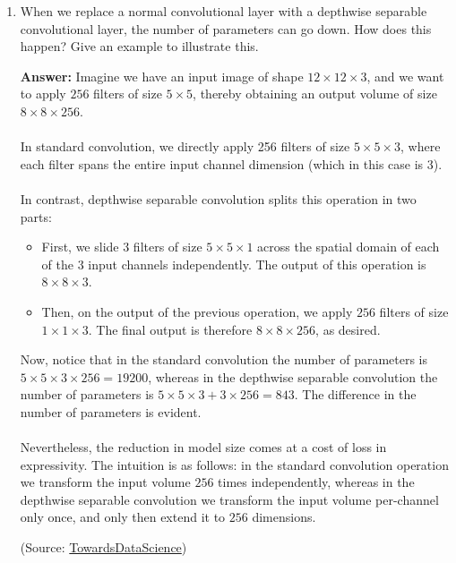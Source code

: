 \documentclass{article}
\newenvironment{QandA}{\begin{enumerate}[label=\arabic*.]}{\end{enumerate}}
\newenvironment{answer}{\par\normalfont \textbf{Answer:}}{}
\begin{document}
\begin{QandA}
    \item When we replace a normal convolutional layer with a depthwise separable convolutional layer, the number of parameters can go down. How does this happen? Give an example to illustrate this.
    \begin{answer}
        Imagine we have an input image of shape $12 \times 12 \times 3$, and we want to apply $256$ filters of size $5 \times 5$, thereby obtaining an output volume of size $8 \times 8 \times 256$. \\\\
        In standard convolution, we  directly apply 256 filters of size $5 \times 5 \times 3$, where each filter spans the entire input channel dimension (which in this case is 3). \\\\
        In contrast, depthwise separable convolution splits this operation in two parts:
        \begin{itemize}
            \item First, we slide $3$ filters of size $5 \times 5 \times 1$ across the spatial domain of each of the $3$ input channels independently. The output of this operation is $8 \times 8 \times 3$. 
            \item Then, on the output of the previous operation, we apply $256$ filters of size $1 \times 1 \times 3$. The final output is therefore $8 \times 8 \times 256$, as desired.
        \end{itemize}
        Now, notice that in the standard convolution the number of parameters is $5 \times 5 \times 3 \times 256 = 19200$, whereas in the depthwise separable convolution the number of parameters is $5 \times 5 \times 3 + 3 \times 256 = 843$. The difference in the number of parameters is evident. \\\\
        Nevertheless, the reduction in model size comes at a cost of loss in expressivity. The intuition is as follows: in the standard convolution operation we transform the input volume $256$ times independently, whereas in the depthwise separable convolution we transform the input volume per-channel only once, and only then extend it to $256$ dimensions.

        (Source: \href{https://towardsdatascience.com/a-basic-introduction-to-separable-convolutions-b99ec3102728#:~:text=The%20depthwise%20separable%20convolution%20is,image%20may%20have%20multiple%20channels.}{TowardsDataScience})
    \end{answer}


\end{QandA}
\end{document}
